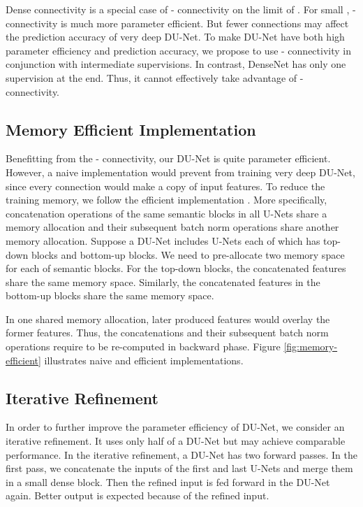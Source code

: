 \documentclass[runningheads]{llncs}
\begin{document}
Dense connectivity is a special case of - connectivity on the limit of . For small , - connectivity is much more parameter efficient. But fewer connections may affect the prediction accuracy of very deep DU-Net. To make DU-Net have both high parameter efficiency and prediction accuracy, we propose to use - connectivity in conjunction with intermediate supervisions. In contrast, DenseNet \cite{huang2016densely} has only one supervision at the end. Thus, it cannot effectively take advantage of - connectivity.




\subsection{Memory Efficient Implementation}
Benefitting from the - connectivity, our DU-Net is quite parameter efficient. However, a naive implementation would prevent from training very deep DU-Net, since every connection would make a copy of input features. To reduce the training memory, we follow the efficient implementation \cite{pleiss2017memory}. More specifically, concatenation operations of the same semantic blocks in all U-Nets share a memory allocation and their subsequent batch norm operations share another memory allocation. Suppose a DU-Net includes  U-Nets each of which has  top-down blocks and  bottom-up blocks. We need to pre-allocate two memory space for each of  semantic blocks. For the  top-down blocks, the concatenated features  share the same memory space. Similarly, the concatenated features  in the  bottom-up blocks share the same memory space.

In one shared memory allocation, later produced features would overlay the former features. Thus, the concatenations and their subsequent batch norm operations require to be re-computed in backward phase. Figure \ref{fig:memory-efficient} illustrates naive and efficient implementations.




\subsection{Iterative Refinement}
In order to further improve the parameter efficiency of DU-Net, we consider an iterative refinement. It uses only half of a DU-Net but may achieve comparable performance. In the iterative refinement, a DU-Net has two forward passes. In the first pass, we concatenate the inputs of the first and last U-Nets and merge them in a small dense block. Then the refined input is fed forward in the DU-Net again. Better output is expected because of the refined input. 
\end{document}
